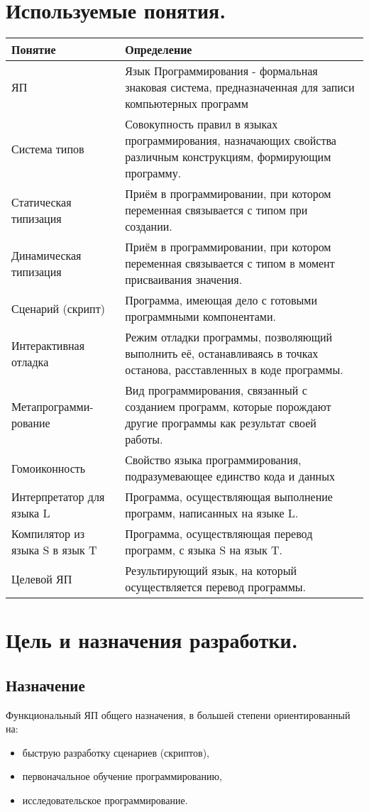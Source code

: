 \documentclass[12pt,a4paper,oneside]{extarticle}
\begin{document}
\section{Используемые понятия.}
    \begin{tabular}{| p{3cm} | p{11cm} |}\hline
    Понятие         & Определение \\ \hline
    ЯП              & Язык Программирования - формальная знаковая система, предназначенная для записи компьютерных программ \\ \hline
    Система типов   & Совокупность правил в языках программирования, назначающих свойства различным конструкциям, формирующим программу. \\ \hline
    Статическая типизация  & Приём в программировании, при котором переменная связывается с типом при создании.\\ \hline
    Динамическая типизация & Приём в программировании, при котором переменная связывается с типом в момент присваивания значения. \\ \hline
    Сценарий (скрипт)      &  Программа, имеющая дело с готовыми программными компонентами. \\ \hline
    Интерактивная отладка  & Режим отладки программы, позволяющий выполнить её, останавливаясь в точках останова, расставленных в коде программы.\\ \hline
    Метапрограмми-рование  & Вид программирования, связанный с созданием программ, которые порождают другие программы как результат своей работы.\\ \hline
    Гомоиконность          & Свойство языка программирования, подразумевающее единство кода и данных\\ \hline
    Интерпретатор для языка L & Программа, осуществляющая выполнение программ, написанных на языке L.\\ \hline
    Компилятор из языка S в язык T & Программа, осуществляющая перевод программ, с языка S на язык T.\\ \hline
    Целевой ЯП              & Результирующий язык, на который осуществляется перевод программы. \\ \hline
    \end{tabular}

\section{Цель и назначения разработки.}
    \subsection{Назначение}
        Функциональный ЯП общего назначения, в большей степени ориентированный на:
            \begin{itemize}
                \item быструю разработку сценариев (скриптов),
                \item первоначальное обучение программированию,
                \item исследовательское программирование.
            \end{itemize}
\end{document}
